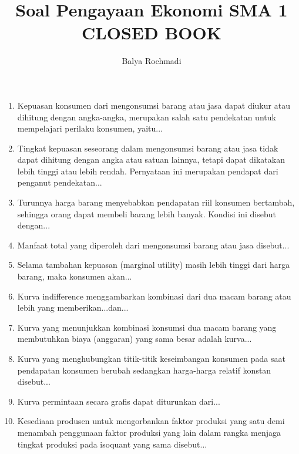 \documentclass[12pt,a4paper,draft,final,oneside,twoside,openright,openany]{article}
\author{Balya Rochmadi}
\title{Soal Pengayaan Ekonomi SMA 1\\CLOSED BOOK }
\begin{document}
	\maketitle
	\begin{enumerate}
		\item Kepuasan konsumen dari mengonsumsi
		barang atau jasa dapat diukur atau
		dihitung dengan angka-angka, merupakan
		salah satu pendekatan untuk mempelajari
		perilaku konsumen, yaitu...
		\item Tingkat kepuasan seseorang dalam
		mengonsumsi barang atau jasa tidak dapat
		dihitung dengan angka atau satuan
		lainnya, tetapi dapat dikatakan lebih tinggi
		atau lebih rendah. Pernyataan ini
		merupakan pendapat dari penganut
		pendekatan...
		\item Turunnya harga barang menyebabkan
		pendapatan riil konsumen bertambah,
		sehingga orang dapat membeli barang
		lebih banyak. Kondisi ini disebut
		dengan...
		\item Manfaat total yang diperoleh dari
		mengonsumsi barang atau jasa disebut...
		\item Selama tambahan kepuasan (marginal
		utility) masih lebih tinggi dari harga
		barang, maka konsumen akan...
		\item Kurva
		indifference
		menggambarkan
		kombinasi dari dua macam barang atau
		lebih yang memberikan...dan...
		\item Kurva yang menunjukkan kombinasi
		konsumsi dua macam barang yang
		membutuhkan biaya (anggaran) yang
		sama besar adalah kurva...
		\item Kurva yang menghubungkan titik-titik
		keseimbangan konsumen pada saat
		pendapatan konsumen berubah sedangkan
		harga-harga relatif konstan disebut...
		\item Kurva permintaan secara grafis dapat
		diturunkan dari...
		\item Kesediaan produsen untuk mengorbankan
		faktor produksi yang satu demi menambah
		penggunaan faktor produksi yang lain
		dalam rangka menjaga tingkat produksi
		pada isoquant yang sama disebut...
	\end{enumerate}
\end{document}
